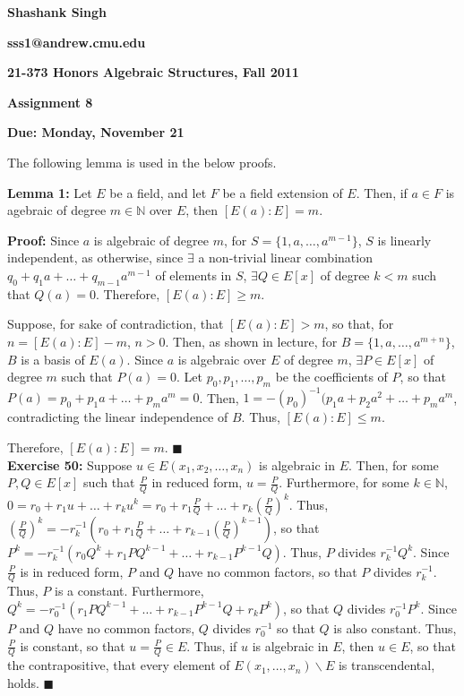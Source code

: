 \documentclass{article}%
\begin{document}
\begin{center}
\textbf{Shashank Singh}

\textbf{sss1@andrew.cmu.edu}

\textbf{21-373 \quad Honors Algebraic Structures, Fall 2011}

\textbf{Assignment 8}

\textbf{Due: Monday, November 21}\\
\end{center}

The following lemma is used in the below proofs.

\textbf{Lemma 1:} Let $E$ be a field, and let $F$ be a field extension of $E$.
Then, if $a \in F$ is agebraic of degree $m \in \mathbb{N}$ over $E$, then
$[E(a) : E] = m$.

\textbf{Proof:} Since $a$ is algebraic of degree $m$, for
$S = \{1, a, \ldots, a^{m - 1}\}$, $S$ is linearly independent, as otherwise,
since $\exists$ a non-trivial linear combination
$q_0 + q_1a + \ldots + q_{m - 1}a^{m - 1}$ of elements in $S$,
$\exists Q \in E[x]$ of degree $k < m$ such that $Q(a) = 0$. Therefore,
$[E(a) : E] \geq m$.

Suppose, for sake of contradiction, that $[E(a) : E] > m$, so that, for
$n = [E(a) : E] - m$, $n > 0$. Then, as shown in lecture,
for $B = \{1, a, \ldots, a^{m + n}\}$,
$B$ is a basis of $E(a)$. Since $a$ is algebraic over $E$ of degree $m$,
$\exists P \in E[x]$ of degree $m$ such that $P(a) = 0$. Let
$p_0, p_1, \ldots, p_m$ be the coefficients of $P$, so that
$P(a) = p_0 + p_1a + \ldots + p_ma^m = 0$. Then,
$1 = -(p_0)^{-1}(p_1a + p_2a^2 + \ldots + p_ma^m$, contradicting the linear
independence of $B$. Thus, $[E(a) : E] \leq m$.

Therefore, $[E(a) : E] = m$. \qquad $\blacksquare$ \\

\textbf{Exercise 50:} Suppose $u \in E(x_1,x_2,\ldots,x_n)$ is algebraic in
$E$. Then, for some $P, Q \in E[x]$ such that $\frac{P}{Q}$ in reduced form,
$u = \frac{P}{Q}$. Furthermore, for some $k \in \mathbb{N}$,
$0 = r_0 + r_1u + \ldots + r_ku^k = r_0 + r_1\frac{P}{Q} + \ldots + r_k\left(
\frac{P}{Q}\right)^k$. Thus, $\left(\frac{P}{Q}\right)^k = -r_k^{-1}
\left(r_0 + r_1\frac{P}{Q} + \ldots +
r_{k - 1}\left(\frac{P}{Q}\right)^{k - 1}\right)$, so that
$P^k = -r_k^{-1} \left(r_0Q^k + r_1PQ^{k - 1} + \ldots + r_{k - 1}P^{k - 1}Q
\right)$.
Thus, $P$ divides $r_k^{-1}Q^k$. Since $\frac{P}{Q}$ is in reduced form, $P$
and $Q$ have no common factors, so that $P$ divides $r_k^{-1}$. Thus, $P$ is
a constant. Furthermore, $Q^k = -r_0^{-1} \left(r_1PQ^{k - 1} + \ldots +
r_{k - 1}P^{k - 1}Q + r_kP^k\right)$, so that $Q$ divides $r_0^{-1}P^{k}$.
Since $P$ and $Q$ have no common factors, $Q$ divides $r_0^{-1}$ so that $Q$
is also constant. Thus, $\frac{P}{Q}$ is constant, so that $u = \frac{P}{Q}
 \in E$. Thus, if $u$ is algebraic in $E$, then $u \in E$, so that the
contrapositive, that every element of $E(x_1, \ldots, x_n) \backslash E$ is
transcendental, holds. \qquad $\blacksquare$ \\
\end{document}
